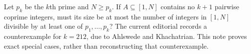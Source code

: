 Let $p_k$ be the $k$th prime and $N\ge p_k$. If $A\subseteq[1,N]$ contains no $k+1$ pairwise coprime integers, must its size be at most the number of integers in $[1,N]$ divisible by at least one of $p_1,\ldots,p_k$? The current editorial records a counterexample for $k=212$, due to Ahlswede and Khachatrian. This note proves exact special cases, rather than reconstructing that counterexample.

